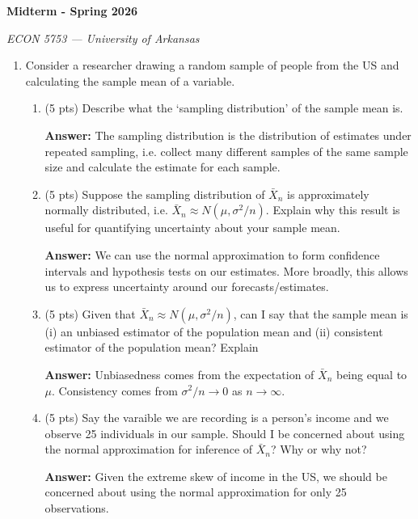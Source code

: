 \documentclass[12pt]{article}
\newcommand{\answer}[1]{{\color{blue_winged_teal}\textbf{Answer:} #1}}
\newcommand{\pts}[1]{{\color{zinc500}(#1 pts)}}
\begin{document}
\begin{center}
  {\Huge\bf Midterm - Spring 2026}

  \smallskip
  {\large\it ECON 5753 — University of Arkansas}
\end{center}

\medskip
\begin{enumerate}
  \item Consider a researcher drawing a random sample of people from the US and calculating the sample mean of a variable.

    \begin{enumerate}
      \item \pts{5} Describe what the `sampling distribution' of the sample mean is.
      
      \answer{The sampling distribution is the distribution of estimates under repeated sampling, i.e. collect many different samples of the same sample size and calculate the estimate for each sample.}

      \item \pts{5} Suppose the sampling distribution of $\bar{X}_n$ is approximately normally distributed, i.e. $\bar{X}_n \approx N(\mu, \sigma^2/n)$.
        Explain why this result is useful for quantifying uncertainty about your sample mean.

      \answer{We can use the normal approximation to form confidence intervals and hypothesis tests on our estimates. More broadly, this allows us to express uncertainty around our forecasts/estimates.}

      \item \pts{5} Given that $\bar{X}_n \approx N(\mu, \sigma^2/n)$, can I say that the sample mean is (i) an unbiased estimator of the population mean and (ii) consistent estimator of the population mean?
        Explain

      \answer{Unbiasedness comes from the expectation of $\bar{X}_n$ being equal to $\mu$. Consistency comes from $\sigma^2/n \to 0$ as $n \to \infty$.}

      \item \pts{5} Say the varaible we are recording is a person's income and we observe 25 individuals in our sample.
        Should I be concerned about using the normal approximation for inference of $\bar{X}_n$?
        Why or why not?

      \answer{Given the extreme skew of income in the US, we should be concerned about using the normal approximation for only 25 observations.}
    \end{enumerate}


\end{enumerate}
\end{document}

